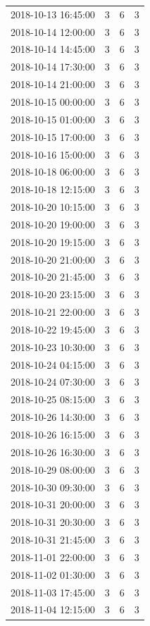 \begin{tabular}{lrrr}
2018-10-13 16:45:00 & 3 & 6 & 3 \\
2018-10-14 12:00:00 & 3 & 6 & 3 \\
2018-10-14 14:45:00 & 3 & 6 & 3 \\
2018-10-14 17:30:00 & 3 & 6 & 3 \\
2018-10-14 21:00:00 & 3 & 6 & 3 \\
2018-10-15 00:00:00 & 3 & 6 & 3 \\
2018-10-15 01:00:00 & 3 & 6 & 3 \\
2018-10-15 17:00:00 & 3 & 6 & 3 \\
2018-10-16 15:00:00 & 3 & 6 & 3 \\
2018-10-18 06:00:00 & 3 & 6 & 3 \\
2018-10-18 12:15:00 & 3 & 6 & 3 \\
2018-10-20 10:15:00 & 3 & 6 & 3 \\
2018-10-20 19:00:00 & 3 & 6 & 3 \\
2018-10-20 19:15:00 & 3 & 6 & 3 \\
2018-10-20 21:00:00 & 3 & 6 & 3 \\
2018-10-20 21:45:00 & 3 & 6 & 3 \\
2018-10-20 23:15:00 & 3 & 6 & 3 \\
2018-10-21 22:00:00 & 3 & 6 & 3 \\
2018-10-22 19:45:00 & 3 & 6 & 3 \\
2018-10-23 10:30:00 & 3 & 6 & 3 \\
2018-10-24 04:15:00 & 3 & 6 & 3 \\
2018-10-24 07:30:00 & 3 & 6 & 3 \\
2018-10-25 08:15:00 & 3 & 6 & 3 \\
2018-10-26 14:30:00 & 3 & 6 & 3 \\
2018-10-26 16:15:00 & 3 & 6 & 3 \\
2018-10-26 16:30:00 & 3 & 6 & 3 \\
2018-10-29 08:00:00 & 3 & 6 & 3 \\
2018-10-30 09:30:00 & 3 & 6 & 3 \\
2018-10-31 20:00:00 & 3 & 6 & 3 \\
2018-10-31 20:30:00 & 3 & 6 & 3 \\
2018-10-31 21:45:00 & 3 & 6 & 3 \\
2018-11-01 22:00:00 & 3 & 6 & 3 \\
2018-11-02 01:30:00 & 3 & 6 & 3 \\
2018-11-03 17:45:00 & 3 & 6 & 3 \\
2018-11-04 12:15:00 & 3 & 6 & 3 \\

\end{tabular}
